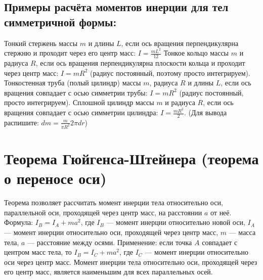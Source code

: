 \documentclass[a4paper]{article}
\begin{document}
	\subsection*{Примеры расчёта моментов инерции для тел симметричной формы:}
	\begin{flushleft}
		Тонкий стержень массы $m$ и длины $L$, если ось вращения перпендикулярна стержню и проходит через его центр масс: $I = \frac{mL^2}{12}$ 
		\linebreak \linebreak
		Тонкое кольцо массы $m$ и радиуса $R$, если ось вращения перпендикулярна плоскости кольца и проходит через центр масс: $I = mR^2$ (радиус постоянный, поэтому просто интегрируем).
		\linebreak \linebreak
		Тонкостенная труба (полый цилиндр) массы $m$, радиуса $R$ и длины $L$, если ось вращения совпадает с осью симметрии трубы: $I = mR^2$ (радиус постоянный, просто интегрируем).
		\linebreak \linebreak
		Сплошной цилиндр массы $m$ и радиуса $R$, если ось вращения совпадает с осью симметрии цилиндра: $I = \frac{mR^2}{2}$.
		\linebreak
		(Для вывода распишите: $dm = \frac{m}{\pi R^ 2}2\pi dr$)
		
	\end{flushleft}
	\section{Теорема Гюйгенса-Штейнера (теорема о переносе оси)}
	\begin{flushleft}
		Теорема позволяет рассчитать момент инерции тела относительно оси, параллельной оси, проходящей через центр масс, на расстоянии $a$ от неё. \linebreak \linebreak
		Формула: $I_B = I_A + ma^2$, где $I_B$ — момент инерции относительно новой оси, $I_A$ — момент инерции относительно оси, проходящей через центр масс, $m$ — масса тела, $a$ — расстояние между осями. \linebreak \linebreak
		Применение: если точка $A$ совпадает с центром масс тела, то $I_B = I_C + ma^2$, где $I_C$ — момент инерции относительно оси через центр масс. Момент инерции тела относительно оси, проходящей через его центр масс, является наименьшим для всех параллельных осей.
		
	\end{flushleft}
\end{document}
